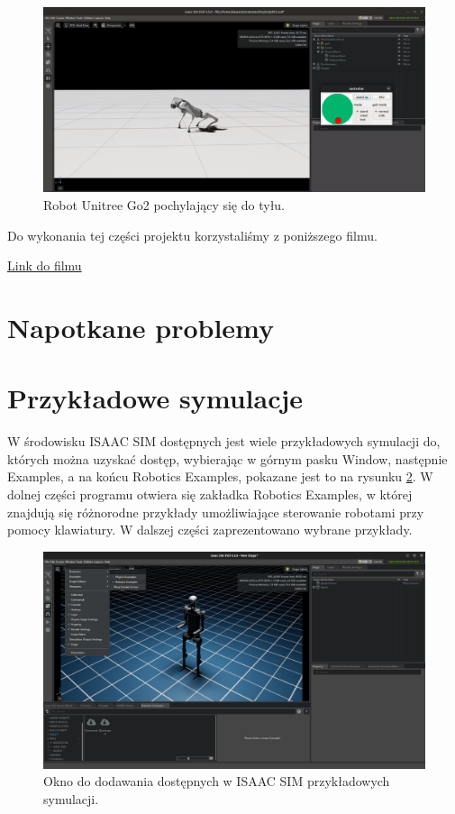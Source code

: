 \documentclass[12pt]{article}
\begin{document}
\begin{figure}[h]
    \centering
    \includegraphics[width=0.8\linewidth]{Zdjęcia/pochylenieTyl.png}
    \caption{Robot Unitree Go2 pochylający się do tyłu.}
    \label{fig:pochylenieTyl}
\end{figure}

Do wykonania tej części projektu korzystaliśmy z poniższego filmu.

\href{https://www.youtube.com/watch?v=L1rpxRm0Q1w&t=581s}{Link do filmu}

\clearpage

\section{Napotkane problemy}

\section{Przykładowe symulacje}

W środowisku ISAAC SIM dostępnych jest wiele przykładowych symulacji do, których można uzyskać dostęp, wybierając w górnym pasku Window, następnie Examples, a na końcu Robotics Examples, pokazane jest to na rysunku \ref{fig:symulacje}.
W dolnej części programu otwiera się zakładka Robotics Examples, w której znajdują się różnorodne przykłady umożliwiające sterowanie robotami przy pomocy klawiatury. W dalszej części zaprezentowano wybrane przykłady.



\begin{figure}[h]
    \centering
    \includegraphics[width=0.8\linewidth]{Zdjęcia/oknoZPrzykladami.png}
    \caption{Okno do dodawania dostępnych w ISAAC SIM przykładowych symulacji.}
    \label{fig:symulacje}
\end{figure}
\end{document}
